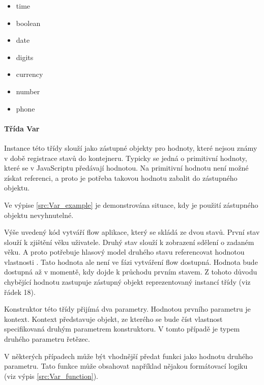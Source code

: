 \documentclass[ing,male,java,dept460]{diploma}						%
\begin{document}
\begin{itemize}
\item time
\item boolean
\item date
\item digits
\item currency
\item number
\item phone
\end{itemize}

\paragraph{Třída Var}
\label{sec:Var}
Instance této třídy slouží jako zástupné objekty pro hodnoty, které nejsou známy v době registrace stavů do kontejneru. Typicky se jedná o primitivní hodnoty, které se v JavaScriptu předávají hodnotou. Na primitivní hodnotu není možné získat referenci, a proto je potřeba takovou hodnotu zabalit do zástupného objektu.

Ve výpise \ref{src:Var_example} je demonstrována situace, kdy je použití zástupného objektu nevyhnutelné.



Výše uvedený kód vytváří flow aplikace, který se skládá ze dvou stavů. První stav slouží k zjištění věku uživatele. Druhý stav slouží k zobrazení sdělení o zadaném věku. A proto potřebuje hlasový model druhého stavu referencovat hodnotou vlastnosti . Tato hodnota ale není ve fázi vytváření flow dostupná. Hodnota bude dostupná až v momentě, kdy dojde k průchodu prvním stavem. Z tohoto důvodu chybějící hodnotu zastupuje zástupný objekt reprezentovaný instancí třídy  (viz řádek 18).

Konstruktor této třídy přijímá dva parametry. Hodnotou prvního parametru je kontext. Kontext představuje objekt, ze kterého se bude číst vlastnost specifikovaná druhým parametrem konstruktoru. V tomto případě je typem druhého parametru řetězec.

V některých případech může být vhodnější předat funkci jako hodnotu druhého parametru. Tato funkce může obsahovat například nějakou formátovací logiku (viz výpis \ref{src:Var_function}).


\end{document}
